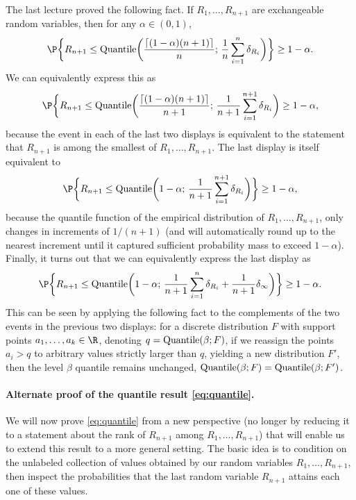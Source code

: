 \documentclass{article}
\begin{document}
The last lecture proved the following fact. If $R_1,\dots,R_{n+1}$ are
exchangeable random variables, then for any $\alpha \in (0,1)$, 
\[
\P\bigg\{ R_{n+1} \leq \Quantile\bigg( \frac{\lceil (1-\alpha)(n+1) \rceil}{n};
\, \frac{1}{n} \sum_{i=1}^n \delta_{R_i} \bigg) \bigg\} \geq 1-\alpha.
\]
We can equivalently express this as
\[
\P\bigg\{ R_{n+1} \leq \Quantile\bigg( \frac{\lceil (1-\alpha)(n+1) \rceil}{n+1}; 
\, \frac{1}{n+1} \sum_{i=1}^{n+1} \delta_{R_i} \bigg) \geq 1-\alpha,
\]
because the event in each of the last two displays is equivalent to the
statement that $R_{n+1}$ is among the 
smallest of $R_1,\dots,R_{n+1}$. The last display is itself equivalent to
\[
\P\bigg\{ R_{n+1} \leq \Quantile\bigg( 1-\alpha; \, \frac{1}{n+1}
\sum_{i=1}^{n+1} \delta_{R_i} \bigg) \bigg\} \geq 1-\alpha, 
\]
because the quantile function of the empirical distribution of
$R_1,\dots,R_{n+1}$, only changes in increments of $1/(n+1)$ (and will
automatically round up to the nearest increment until it captured sufficient
probability mass to exceed $1-\alpha$). Finally, it turns out that we can
equivalently express the last display as  
\begin{equation}
\label{eq:quantile}
\P\bigg\{ R_{n+1} \leq \Quantile\bigg( 1-\alpha; \, \frac{1}{n+1} \sum_{i=1}^n
\delta_{R_i} + \frac{1}{n+1} \delta_\infty \bigg) \bigg\} \geq 1-\alpha.
\end{equation}
This can be seen by applying the following fact to the complements of the two
events in the previous two displays: for a discrete distribution $F$ with
support points $a_1,\dots,a_k \in \R$, denoting $q=\mathrm{Quantile}(\beta; F)$, if we
reassign the points $a_i > q$ to arbitrary values strictly larger than $q$,
yielding a new distribution $F'$, then the level $\beta$ quantile remains
unchanged, $\mathrm{Quantile}(\beta; F) = \mathrm{Quantile}(\beta; F')$.  

\paragraph{Alternate proof of the quantile result \eqref{eq:quantile}.}

We will now prove \eqref{eq:quantile} from a new perspective (no longer by
reducing it to a statement about the rank of $R_{n+1}$ among
$R_1,\dots,R_{n+1}$) that will enable us to extend this result to a more general
setting. The basic idea is to condition on the unlabeled collection of values
obtained by our random variables $R_1,\dots,R_{n+1}$, then inspect the
probabilities that the last random variable $R_{n+1}$ attains each one of these
values.  
\end{document}

